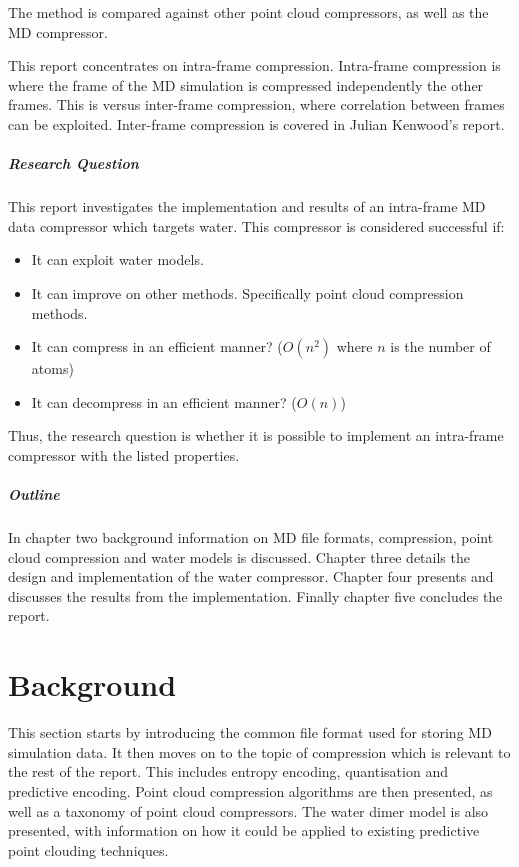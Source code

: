 \documentclass[a4paper]{report}
\begin{document}
The method is compared against other point cloud compressors, as well as the
\citet{omeltchenko2000sls} MD compressor.

This report concentrates on intra-frame compression. Intra-frame compression
is where the frame of the MD simulation is compressed independently the other
frames. This is versus inter-frame compression, where correlation between
frames can be exploited. Inter-frame compression is covered in Julian
Kenwood's report.

\paragraph{Research Question}

This report investigates the implementation and results of an intra-frame MD
data compressor which targets water. This compressor is considered successful if:

\begin{itemize}
  \item It can exploit water models.
  \item It can improve on other methods. Specifically point cloud compression
    methods.
  \item It can compress in an efficient manner? ($O(n^2)$ where $n$ is the
    number of atoms)
  \item It can decompress in an efficient manner? ($O(n)$)
\end{itemize}

Thus, the research question is whether it is possible to implement an
intra-frame compressor with the listed properties.


\paragraph{Outline}

In chapter two background information on MD file formats, compression, point
cloud compression and water models is discussed. Chapter three details the
design and implementation of the water compressor. Chapter four presents and
discusses the results from the implementation. Finally chapter five concludes
the report.



\chapter{Background}

This section starts by introducing the common file format used for storing MD
simulation data. It then moves on to the topic of compression which is
relevant to the rest of the report. This includes entropy encoding,
quantisation and predictive encoding. Point cloud compression algorithms are
then presented, as well as a taxonomy of point cloud compressors. The water
dimer model is also presented, with information on how it could be applied to
existing predictive point clouding techniques.
\end{document}
